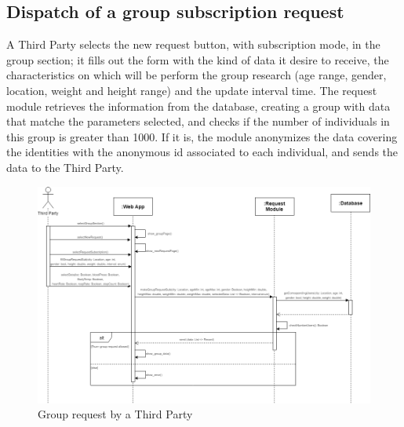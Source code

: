 \subsection{Dispatch of a group subscription request }
A Third Party selects the new request button, with subscription mode, in the group section; it fills out the form with the kind of data it desire to receive, the characteristics on which will be perform the group research (age range, gender, location, weight and height range) and the update interval time. The request module retrieves the information from the database, creating a group with data that matche the parameters selected, and checks if the number of individuals in this group is greater than 1000. If it is, the module anonymizes the data covering the identities with the anonymous id associated to each individual, and sends the data to the Third Party.



\begin{figure}[H]
    \centering
    \includegraphics[scale=0.35]{DD/Pictures/groupRequestSeqDiagDD.png}
    \caption{Group request by a Third Party}
\end{figure}
